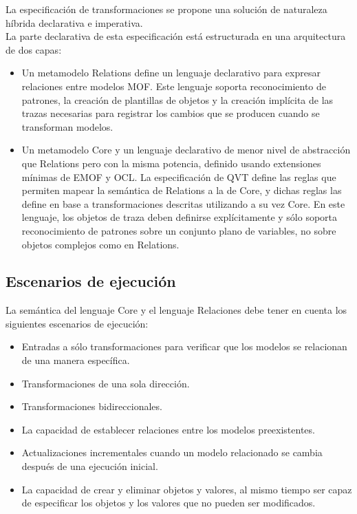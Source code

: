 La especificación de transformaciones se propone una solución de naturaleza híbrida declarativa e imperativa.\\

La parte declarativa de esta especificación está estructurada en una arquitectura de dos capas:

\begin{itemize}
	\item Un metamodelo Relations define un lenguaje declarativo para expresar relaciones entre modelos MOF. Este lenguaje soporta reconocimiento de patrones, la creación de plantillas de objetos y la creación implícita de las trazas necesarias para registrar los cambios que se producen cuando se transforman modelos.	
	\item Un metamodelo Core y un lenguaje declarativo de menor nivel de abstracción que Relations pero con la misma potencia, definido usando extensiones mínimas de EMOF y OCL. La especificación de QVT define las reglas que permiten mapear la semántica de Relations a la de Core, y dichas reglas las define en base a transformaciones descritas utilizando a su vez Core. En este lenguaje, los objetos de traza deben definirse explícitamente y sólo soporta reconocimiento de patrones sobre un conjunto plano de variables, no sobre objetos complejos como en Relations.
\end{itemize}

\subsection{Escenarios de ejecución}
\label{Escenarios de ejecución}

La semántica del lenguaje Core y el lenguaje Relaciones debe tener en cuenta los siguientes escenarios de ejecución:
\begin{itemize}
	\item Entradas a sólo transformaciones para verificar que los modelos se relacionan de una manera específica.	
	\item Transformaciones de una sola dirección.	
	\item Transformaciones bidireccionales.
	\item La capacidad de establecer relaciones entre los modelos preexistentes.
	\item Actualizaciones incrementales cuando un modelo relacionado se cambia después de una ejecución inicial.
	\item La capacidad de crear y eliminar objetos y valores, al mismo tiempo ser capaz de especificar los objetos y los valores que no pueden ser modificados.
\end{itemize}

